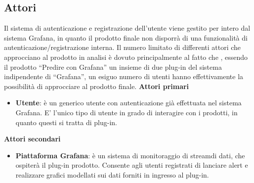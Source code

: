 	\subsection{Attori}
Il sistema di autenticazione e registrazione dell’utente viene gestito per intero dal sistema Grafana, in quanto il prodotto finale non disporrà di una funzionalità di autenticazione/registrazione interna.
Il numero limitato di differenti  attori che approcciano al prodotto in analisi è dovuto principalmente  al fatto che , essendo il prodotto “Predire con Grafana” un insieme di due plug-in del sistema indipendente di “Grafana”, un esiguo numero di utenti hanno effettivamente la possibilità di approcciare al prodotto finale.
\textbf{Attori primari}
	\begin{itemize}
		\item\textbf{Utente}: è un generico utente con autenticazione già effettuata nel sistema Grafana. E’ l’unico tipo di utente in grado di interagire con i prodotti, in quanto questi si tratta di plug-in.

 	\end{itemize}
\textbf{Attori secondari}
	\begin{itemize}
		\item\textbf{Piattaforma Grafana}: è un sistema di monitoraggio di stream\glo di dati, che ospiterà il plug-in prodotto. Consente agli utenti registrati di lanciare alert e realizzare grafici modellati sui dati forniti in ingresso al plug-in.
 	\end{itemize}

